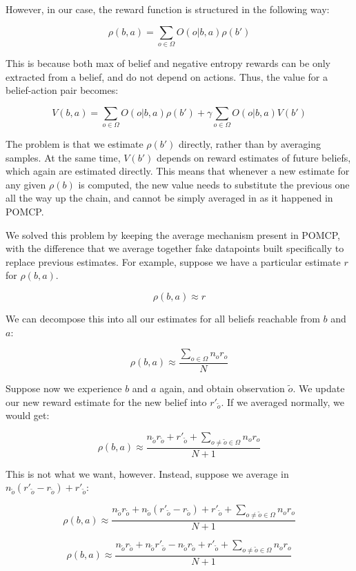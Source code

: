 However, in our case, the reward function is structured in the following way:

\[ \rho(b,a) = \sum_{o\in \Omega} O(o | b, a) \rho(b') \]

This is because both max of belief and negative entropy rewards can be only extracted from a belief,
and do not depend on actions. Thus, the value for a belief-action pair becomes:

\[ V(b,a) = \sum_{o\in \Omega} O(o | b,a) \rho(b') + \gamma\sum_{o\in\Omega} O(o|b,a) V(b') \]

The problem is that we estimate $\rho(b')$ directly, rather than by averaging samples. At the same
time, $V(b')$ depends on reward estimates of future beliefs, which again are estimated directly.
This means that whenever a new estimate for any given $\rho(b)$ is computed, the new value needs to
substitute the previous one all the way up the chain, and cannot be simply averaged in as it
happened in POMCP.

We solved this problem by keeping the average mechanism present in POMCP, with the difference that
we average together fake datapoints built specifically to replace previous estimates. For
example, suppose we have a particular estimate $r$ for $\rho(b, a)$.

\[ \rho(b,a) \approx r \]

We can decompose this into all our estimates for all beliefs reachable from $b$ and $a$:

\[ \rho(b,a) \approx \frac{\sum_{o\in\Omega} n_o r_o}{N} \]

Suppose now we experience $b$ and $a$ again, and obtain observation $\tilde{o}$. We update our new
reward estimate for the new belief into $r'_{\tilde{o}}$. If we averaged normally, we would get:

\[ \rho(b,a) \approx \frac{ n_{\tilde{o}} r_{\tilde{o}} + r'_{\tilde{o}} +
\sum_{o \neq \tilde{o} \in \Omega} n_o r_o}{N+1} \]

This is not what we want, however. Instead, suppose we average in $n_{\tilde{o}}(r'_{\tilde{o}} -
r_{\tilde{o}}) + r'_{\tilde{o}}$:

\[ \rho(b,a) \approx \frac{ n_{\tilde{o}} r_{\tilde{o}} + n_{\tilde{o}}(r'_{\tilde{o}} -
r_{\tilde{o}}) + r'_{\tilde{o}} +
\sum_{o \neq \tilde{o} \in \Omega} n_o r_o}{N+1} \]

\[ \rho(b,a) \approx \frac{ n_{\tilde{o}} r_{\tilde{o}} + n_{\tilde{o}}r'_{\tilde{o}} -
        n_{\tilde{o}} r_{\tilde{o}} + r'_{\tilde{o}} +
\sum_{o \neq \tilde{o} \in \Omega} n_o r_o}{N+1} \]

